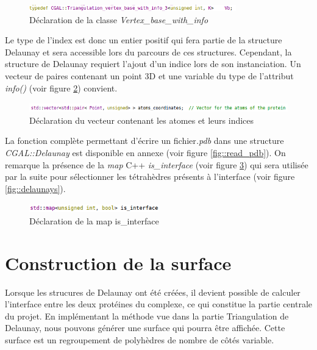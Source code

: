 \begin{figure}[ht]
\centering
  \includegraphics[width=0.8\textwidth]{figures/vertex_base.png}
  \caption{Déclaration de la classe \textit{Vertex\_base\_with\_info}}
  \label{fig::vertex_base}
\end{figure}

Le type de l'index est donc un entier positif qui fera partie de la structure Delaunay
et sera accessible lors du parcours de ces structures. Cependant, la structure de Delaunay
requiert l'ajout d'un indice lors de son instanciation. Un vecteur de paires contenant
un point 3D et une variable du type de l'attribut \textit{info()} (voir figure
\ref{fig::vector_atom_index}) convient.

\begin{figure}[ht]
\centering
  \includegraphics[width=\textwidth]{figures/vector_atom_index.png}
  \caption{Déclaration du vecteur contenant les atomes et leurs indices}
  \label{fig::vector_atom_index}
\end{figure}

La fonction complète permettant d'écrire un fichier\textit{.pdb} dans une structure
\textit{CGAL::Delaunay} est disponible en annexe (voir figure \ref{fig::read_pdb}).
On remarque la présence de la \textit{map} C++ \textit{is\_interface}
(voir figure \ref{fig::is_interface}) qui sera utilisée par la suite
pour sélectionner les tétrahèdres présents à l'interface (voir figure \ref{fig::delaunays}).

\begin{figure}[ht]
\centering
  \includegraphics[width=0.5\textwidth]{figures/is_interface.png}
  \caption{Déclaration de la map is\_interface}
  \label{fig::is_interface}
\end{figure}




\section{Construction de la surface}


Lorsque les strucures de Delaunay ont été créées, il devient possible de calculer l'interface
entre les deux protéines du complexe, ce qui constitue la partie centrale du projet.
En implémentant la méthode vue dans la partie Triangulation de Delaunay, nous pouvons générer
une surface qui pourra être affichée. Cette surface est un regroupement de polyhèdres
de nombre de côtés variable.



